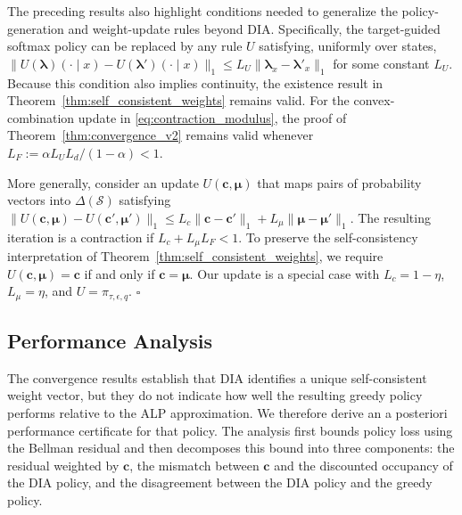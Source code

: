 \documentclass[sglanonrev]{informs4}
\providecommand{\bc}{\boldsymbol{c}}
\providecommand{\blambda}{\boldsymbol{\lambda}}
\providecommand{\bmu}{\boldsymbol{\mu}}
\def\edits#1{{\color{black}#1}}
\begin{document}
\begin{remark}[Generalizations.]
\edits{The preceding results also highlight conditions needed to generalize the policy-generation and weight-update rules beyond \ac{DIA}. Specifically, the target-guided softmax policy can be replaced by any rule $U$ satisfying, uniformly over
states, $\|U(\blambda)(\cdot\mid x)-U(\blambda')(\cdot\mid x)\|_1
\leq L_U\|\blambda_x-\blambda'_x\|_1$ for some constant $L_U$. Because this condition also
implies continuity, the existence result in Theorem~\ref{thm:self_consistent_weights} remains valid. For the
convex-combination update in \eqref{eq:contraction_modulus}, the proof of Theorem~\ref{thm:convergence_v2} remains valid whenever
$L_F:=\alpha L_UL_d/(1-\alpha)<1$. }

\edits{More generally, consider an update $U(\bc,\bmu)$ that maps pairs of probability vectors into $\Delta(\mathcal S)$ satisfying
$\|U(\bc,\bmu)-U(\bc',\bmu')\|_1 \leq L_c\|\bc-\bc'\|_1+L_\mu\|\bmu-\bmu'\|_1$. The resulting iteration is a contraction if $L_c+L_\mu L_F<1$. 
To preserve the self-consistency interpretation of Theorem~\ref{thm:self_consistent_weights}, we require $U(\bc,\bmu)=\bc$ if and only if $\bc=\bmu$. Our update is a special case with $L_c=1-\eta$, $L_\mu=\eta$, and $U=\pi_{\tau,\epsilon,q}$. \hfill $\square$}
\end{remark}


\subsection{Performance Analysis} 
\label{sec:performance}
\edits{The convergence results establish that \ac{DIA} identifies a unique self-consistent weight vector, but they do not indicate how well the resulting greedy policy performs relative to the \ac{ALP} approximation. We therefore derive an a posteriori performance certificate for that policy.} The analysis first bounds policy loss using the Bellman residual and then decomposes this bound into three components: the residual weighted by $\bc$, the mismatch between $\bc$ and the discounted occupancy of the \ac{DIA} policy, and the disagreement between the \ac{DIA} policy and the greedy policy.
\end{document}
